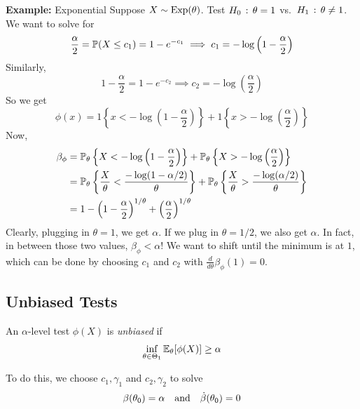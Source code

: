 \begin{example}{\textbf{Example:} Exponential}
    Suppose $X \sim \tt{Exp}(\theta)$. Test $H_0 \col \theta = 1$ vs.\ $H_1 \col \theta \neq 1$. We want to solve for
    \[ \frac{\alpha}{2} = \bb{P}(X \leq c_1) = 1 - e^{-c_1} \implies c_1 = -\log\left(1 - \frac{\alpha}{2}\right) \]
    Similarly,
    \[ 1 - \frac{\alpha}{2} = 1 - e^{-c_2} \implies c_2 = -\log\left(\frac{\alpha}{2}\right) \]
    So we get
    \[ \phi(x) = 1\left\{x < -\log\left(1 - \frac{\alpha}{2}\right)\right\} + 1\left\{x > -\log\left(\frac{\alpha}{2}\right)\right\} \]
    Now,
    \begin{align*}
        \beta_{\phi} &= \bb{P}_{\theta}\left\{X < -\log\left(1 - \frac{\alpha}{2}\right)\right\} + \bb{P}_{\theta}\left\{X > -\log\left(\frac{\alpha}{2}\right)\right\}\\
        &= \bb{P}_{\theta}\left\{\frac{X}{\theta} < \frac{-\log(1 - \alpha/2)}{\theta}\right\} + \bb{P}_{\theta}\left\{\frac{X}{\theta} > \frac{-\log(\alpha/2)}{\theta}\right\}\\
        &= 1 - \left(1 - \frac{\alpha}{2}\right)^{1/\theta} + \left(\frac{\alpha}{2}\right)^{1/\theta}
    \end{align*}
    Clearly, plugging in $\theta = 1$, we get $\alpha$. If we plug in $\theta = 1/2$, we also get $\alpha$. In fact, in between those two values, $\beta_{\phi} < \alpha$!
    We want to shift until the minimum is at $1$, which can be done by choosing $c_1$ and $c_2$ with $\frac{d}{d\theta}\beta_{\phi}(1) = 0$.
\end{example}

\subsection*{Unbiased Tests}
\sectionspace

\begin{definition}
    An $\alpha$-level test $\phi(X)$ is \emph{unbiased} if
    \[ \inf_{\theta \in \Theta_1} \E_{\theta}[\phi(X)] \geq \alpha \]
\end{definition}

To do this, we choose $c_1, \gamma_1$ and $c_2, \gamma_2$ to solve
\[ \beta(\theta_0) = \alpha \quand \dot{\beta}(\theta_0) = 0 \]

